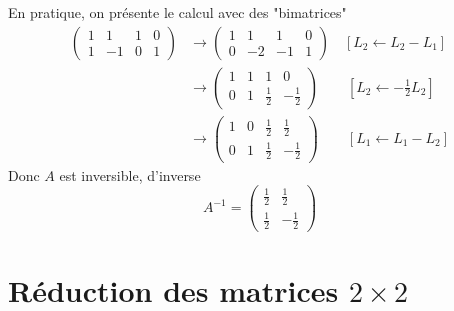 \documentclass[10pt,a4paper]{article}
\theoremstyle{definition}
\begin{document}
\noindent En pratique, on présente le calcul avec des "bimatrices"
\begin{align*}
\left(\begin{array}{cc|cc}
1 & 1 & 1 & 0 \\
1 & -1 & 0 & 1
\end{array}\right) &\rightarrow
\left(\begin{array}{cc|cc}
1 & 1 & 1 & 0 \\
0 & -2 & -1 & 1
\end{array}\right) \quad [L_2 \leftarrow L_2 - L_1] \\
&\rightarrow
\left(\begin{array}{cc|cc}
1 & 1 & 1 & 0 \\
0 & 1 & \frac{1}{2} & -\frac{1}{2}
\end{array}\right) \quad \quad [L_2 \leftarrow -\frac{1}{2}L_2] \\
&\rightarrow
\left(\begin{array}{cc|cc}
1 & 0 & \frac{1}{2} & \frac{1}{2} \\
0 & 1 & \frac{1}{2} & -\frac{1}{2}
\end{array}\right) \quad \quad [L_1 \leftarrow L_1 - L_2]
\end{align*}
Donc $A$ est inversible, d'inverse
\[ A^{-1} = \begin{pmatrix}
\frac{1}{2} & \frac{1}{2} \\
\frac{1}{2} & -\frac{1}{2}
\end{pmatrix} \]

\section{Réduction des matrices $2 \times 2$}
\end{document}
